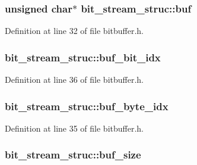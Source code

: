 \subsubsection[{\texorpdfstring{buf}{buf}}]{\setlength{\rightskip}{0pt plus 5cm}unsigned char$\ast$ bit\+\_\+stream\+\_\+struc\+::buf}\hypertarget{structbit__stream__struc_aa9bc37a08d818a5edf70a98a3dc055e1}{}\label{structbit__stream__struc_aa9bc37a08d818a5edf70a98a3dc055e1}


Definition at line 32 of file bitbuffer.\+h.

\subsubsection[{\texorpdfstring{buf\+\_\+bit\+\_\+idx}{buf_bit_idx}}]{ bit\+\_\+stream\+\_\+struc\+::buf\+\_\+bit\+\_\+idx}\hypertarget{structbit__stream__struc_a3b53a2a5ee2f6bb60897873289e7fab9}{}\label{structbit__stream__struc_a3b53a2a5ee2f6bb60897873289e7fab9}


Definition at line 36 of file bitbuffer.\+h.

\subsubsection[{\texorpdfstring{buf\+\_\+byte\+\_\+idx}{buf_byte_idx}}]{ bit\+\_\+stream\+\_\+struc\+::buf\+\_\+byte\+\_\+idx}\hypertarget{structbit__stream__struc_a17135b83b424387b48a0db32666a22e1}{}\label{structbit__stream__struc_a17135b83b424387b48a0db32666a22e1}


Definition at line 35 of file bitbuffer.\+h.

\subsubsection[{\texorpdfstring{buf\+\_\+size}{buf_size}}]{ bit\+\_\+stream\+\_\+struc\+::buf\+\_\+size}\hypertarget{structbit__stream__struc_a4bfbcb5b5005121a94a234988f5ae178}{}\label{structbit__stream__struc_a4bfbcb5b5005121a94a234988f5ae178}


